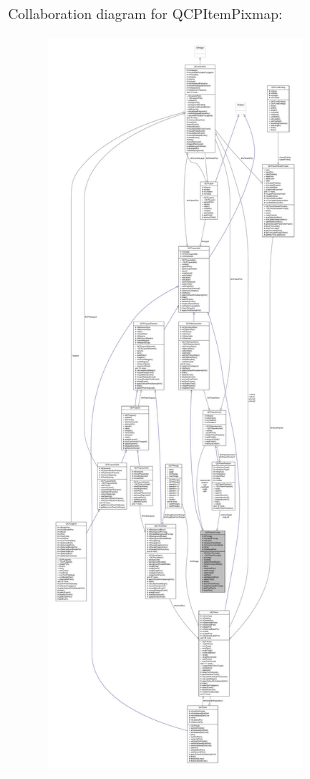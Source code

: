 Collaboration diagram for Q\+C\+P\+Item\+Pixmap\+:\nopagebreak
\begin{figure}[H]
\begin{center}
\leavevmode
\includegraphics[height=550pt]{class_q_c_p_item_pixmap__coll__graph}
\end{center}
\end{figure}
